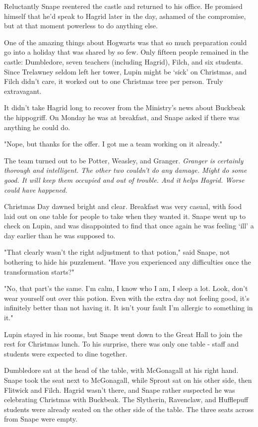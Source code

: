 Reluctantly Snape reentered the castle and returned to his office. He promised himself that he'd speak to Hagrid later in the day, ashamed of the compromise, but at that moment powerless to do anything else.

One of the amazing things about Hogwarts was that so much preparation could go into a holiday that was shared by so few. Only fifteen people remained in the castle: Dumbledore, seven teachers (including Hagrid), Filch, and six students. Since Trelawney seldom left her tower, Lupin might be `sick' on Christmas, and Filch didn't care, it worked out to one Christmas tree per person. Truly extravagant.

It didn't take Hagrid long to recover from the Ministry's news about Buckbeak the hippogriff. On Monday he was at breakfast, and Snape asked if there was anything he could do.

"Nope, but thanks for the offer. I got me a team working on it already."

The team turned out to be Potter, Weasley, and Granger. \emph{Granger is certainly thorough and intelligent. The other two{\el} couldn't do any damage. Might do some good. It will keep them occupied and out of trouble. And it helps Hagrid. Worse could have happened.}

Christmas Day dawned bright and clear. Breakfast was very casual, with food laid out on one table for people to take when they wanted it. Snape went up to check on Lupin, and was disappointed to find that once again he was feeling `ill' a day earlier than he was supposed to.

"That clearly wasn't the right adjustment to that potion," said Snape, not bothering to hide his puzzlement. "Have you experienced any difficulties once the transformation starts?"

"No, that part's the same. I'm calm, I know who I am, I sleep a lot. Look, don't wear yourself out over this potion. Even with the extra day not feeling good, it's infinitely better than not having it. It isn't your fault I'm allergic to something in it."

Lupin stayed in his rooms, but Snape went down to the Great Hall to join the rest for Christmas lunch. To his surprise, there was only one table - staff and students were expected to dine together.

Dumbledore sat at the head of the table, with McGonagall at his right hand. Snape took the seat next to McGonagall, while Sprout sat on his other side, then Flitwick and Filch. Hagrid wasn't there, and Snape rather suspected he was celebrating Christmas with Buckbeak. The Slytherin, Ravenclaw, and Hufflepuff students were already seated on the other side of the table. The three seats across from Snape were empty.

